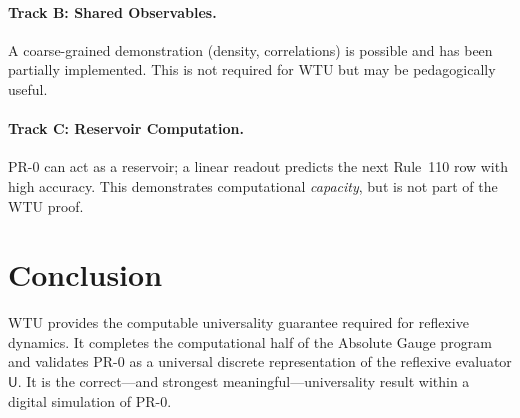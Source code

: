 \paragraph{Track B: Shared Observables.}
A coarse-grained demonstration (density, correlations) is possible and has been partially
implemented. This is not required for WTU but may be pedagogically useful.

\paragraph{Track C: Reservoir Computation.}
PR-0 can act as a reservoir; a linear readout predicts the next Rule~110 row with high
accuracy. This demonstrates computational \emph{capacity}, but is not part of the WTU proof.

\section{Conclusion}

WTU provides the computable universality guarantee required for reflexive dynamics.
It completes the computational half of the Absolute Gauge program and validates PR-0 as a
universal discrete representation of the reflexive evaluator $\mathsf{U}$.
It is the correct---and strongest meaningful---universality result within a digital
simulation of PR-0.
